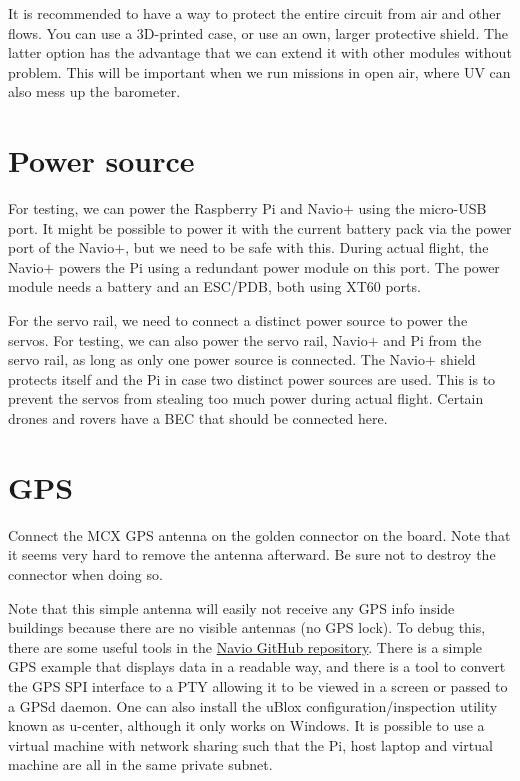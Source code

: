 \documentclass{article}
\newcommand{\navio}{Navio$\stackrel{}{+}$}
\begin{document}
It is recommended to have a way to protect the entire circuit from air and 
other flows. You can use a 3D-printed case, or use an own, larger protective 
shield. The latter option has the advantage that we can extend it with other 
modules without problem. This will be important when we run missions in open 
air, where UV can also mess up the barometer.

\section{Power source}
For testing, we can power the Raspberry Pi and \navio{} using the micro-USB 
port. It might be possible to power it with the current battery pack via the 
power port of the \navio{}, but we need to be safe with this. During actual 
flight, the \navio{} powers the Pi using a redundant power module on this port. 
The power module needs a battery and an ESC/PDB, both using XT60 ports.

For the servo rail, we need to connect a distinct power source to power the 
servos. For testing, we can also power the servo rail, \navio{} and Pi from the 
servo rail, as long as only one power source is connected. The \navio{} shield 
protects itself and the Pi in case two distinct power sources are used. This is 
to prevent the servos from stealing too much power during actual flight. 
Certain drones and rovers have a BEC that should be connected here.

\section{GPS}
Connect the MCX GPS antenna on the golden connector on the board. Note that it 
seems very hard to remove the antenna afterward. Be sure not to destroy the 
connector when doing so.

Note that this simple antenna will easily not receive any GPS info inside 
buildings because there are no visible antennas (no GPS lock). To debug this, 
there are some useful tools in the \href{https://github.com/emlid/Navio}{Navio 
GitHub repository}. There is a simple GPS example that displays data in 
a readable way, and there is a tool to convert the GPS SPI interface to a PTY 
allowing it to be viewed in a screen or passed to a GPSd daemon. One can also 
install the uBlox configuration/inspection utility known as u-center, although 
it only works on Windows. It is possible to use a virtual machine with network 
sharing such that the Pi, host laptop and virtual machine are all in the same 
private subnet.
\end{document}
